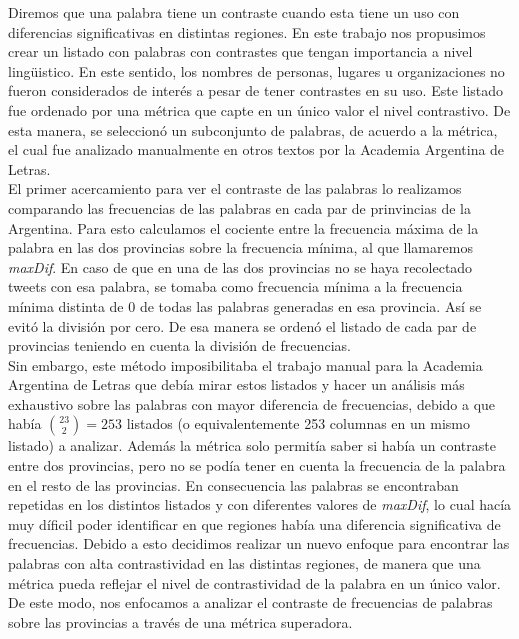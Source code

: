 Diremos que una palabra tiene un contraste cuando esta tiene un uso con diferencias significativas en
distintas regiones. En este trabajo nos propusimos crear un listado con palabras con contrastes que tengan
importancia a nivel lingüistico. En este sentido, los nombres de personas, lugares u organizaciones no 
fueron considerados de interés a pesar de tener contrastes en su uso.
Este listado fue ordenado por una métrica que capte en un único valor el nivel contrastivo. De esta manera, 
se seleccionó un subconjunto de palabras, de acuerdo a la métrica, el cual fue analizado manualmente en otros textos por la Academia Argentina de Letras.\\
El primer acercamiento para ver el contraste de las palabras lo realizamos comparando las frecuencias de las palabras 
en cada par de prinvincias de la Argentina. Para esto calculamos el cociente entre la frecuencia máxima de la palabra
en las dos provincias sobre la frecuencia mínima, al que llamaremos \textit{maxDif}. En caso de que en una de las dos provincias no se haya 
recolectado tweets con esa palabra, se tomaba como frecuencia mínima a la frecuencia mínima distinta de 0 de todas las palabras generadas en esa provincia. Así se evitó la división por cero.
De esa manera se ordenó el listado de cada par de provincias teniendo en cuenta la división de frecuencias. \\
Sin embargo, este método imposibilitaba el trabajo manual para la Academia Argentina de Letras que debía mirar estos listados y hacer un análisis más exhaustivo sobre las palabras con mayor diferencia de frecuencias, debido a que había $\binom{23}{2} = 253$
listados (o equivalentemente 253 columnas en un mismo listado) a analizar. Además la métrica solo permitía saber si había un contraste entre dos provincias, pero no se podía tener en cuenta la frecuencia de la palabra en el resto de las provincias. 
En consecuencia las palabras se encontraban repetidas en los distintos listados y con diferentes valores de \textit{maxDif}, lo cual hacía muy díficil poder identificar en que regiones había una diferencia significativa de frecuencias. Debido a esto decidimos realizar un nuevo enfoque para encontrar las palabras con alta contrastividad en las distintas regiones, de manera que una métrica pueda reflejar el nivel de contrastividad de la palabra en un único valor.
De este modo, nos enfocamos a analizar el contraste de frecuencias de palabras sobre las provincias a través de una métrica superadora.

